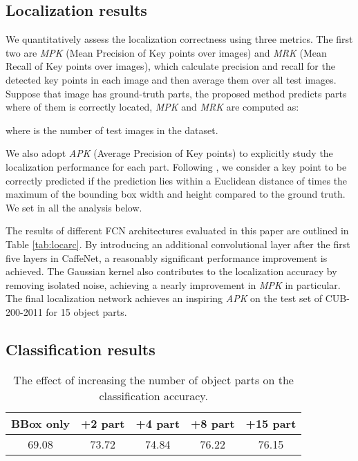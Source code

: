\documentclass[10pt,twocolumn,letterpaper]{article}
\begin{document}
\subsection{Localization results}
We quantitatively assess the localization correctness using three metrics. The first two are \emph{MPK} (Mean Precision of Key points over images) and \emph{MRK} (Mean Recall of Key points over images), which calculate precision and recall for the detected key points in each image and then average them over all test images. Suppose that image  has  ground-truth parts, the proposed method predicts  parts where  of them is correctly located, \emph{MPK} and \emph{MRK} are computed as:


where  is the number of test images in the dataset.

We also adopt \emph{APK} (Average Precision of Key points) \cite{yang2013articulated} to explicitly study the localization performance for each part.
Following \cite{long2014convnets}, we consider a key point to be correctly predicted if the prediction lies within a Euclidean distance of  times
the maximum of the bounding box width and height compared to the ground truth.
We set  in all the analysis below.

The results of different FCN architectures evaluated in this paper are outlined in Table \ref{tab:locarc}. By introducing an additional  convolutional layer after the first five layers in CaffeNet, a reasonably significant performance improvement is achieved. The Gaussian kernel also contributes to the localization accuracy by removing isolated noise, achieving a nearly  improvement in \emph{MPK} in particular. The final localization network achieves an inspiring  \emph{APK} on the test set of CUB-200-2011 for 15 object parts.







\subsection{Classification results}
\begin{table}[t]
\small
\begin{center}
\begin{tabular}{c|c|c|c|c}
\hline
BBox only & +2 part & +4 part & +8 part & +15 part\\
\hline
69.08 & 73.72 & 74.84 & 76.22 & 76.15\\
\hline
\end{tabular}
\end{center}
\caption{The effect of increasing the number of object parts on the classification accuracy.}
\label{tab:increm}
\end{table}
\end{document}
